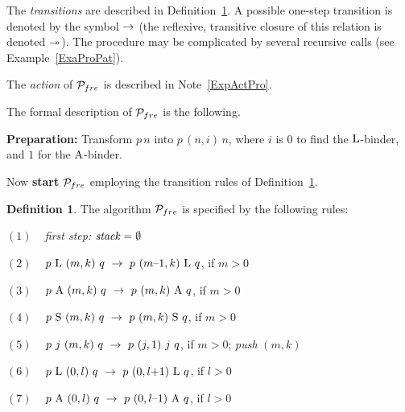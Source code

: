 \documentclass{article}
\theoremstyle{plain}
\theoremstyle{definition}
\newtheorem{Def}[The]{Definition}
\begin{document}
{The {\it transitions\/} are described in Definition~\ref{DefAlgBin}. A possible one-step transition is denoted by the symbol $\rightarrow$ (the reflexive, transitive closure of this relation is denoted $\twoheadrightarrow$). The procedure may be complicated by several recursive calls (see Example~\ref{ExaProPat}).

The {\it action\/} of ${\cal P}_{fre}$ is described in Note~\ref{ExpActPro}.



\smallskip

The formal description of ${\cal P}_{fre}$ is the following.

\smallskip

{\bf Preparation:} Transform $p \, n$ into $p \, (n,i) \, n$, where $i$ is $0$ to find the ${\rm L}$-binder, and $1$ for the ${\rm A}$-binder.

Now {\bf start} ${\cal P}_{fre}$ employing the transition rules of Definition~\ref{DefAlgBin}.







\begin{Def}\label{DefAlgBin}
The algorithm ${\cal P}_{fre}$ is specified by the following rules:

$(1)$ ~ {\it first step:} ${\it stack} = \emptyset$


$(2)$ ~ $p ~ {\rm L} ~ (m,k) ~ q ~ \rar ~ p ~ (m \makebox{--} 1,k) ~ {\rm L} ~ q$, if $m > 0$

$(3)$ ~ $p ~ {\rm A} ~ (m,k) ~ q ~ \rightarrow ~ p ~ (m,k) ~ {\rm A} ~ q$, if $m > 0$

$(4)$ ~ $p ~ {\rm S} ~ (m,k) ~ q ~ \rightarrow ~ p ~ (m,k) ~ {\rm S} ~ q$, if $m > 0$

$(5)$ ~ $p ~ j ~ (m,k) ~ q ~ \rightarrow ~ p ~ (j,1) ~ j ~ q$, if $m > 0$; {\it push} $(m,k)$

$(6)$ ~ $p ~ {\rm L} ~ (0,l) ~ q ~ \rar ~ p ~ (0,l \makebox{+} 1) ~ {\rm L} ~ q$, if $l > 0$

$(7)$ ~ $p ~ {\rm A} ~ (0,l) ~ q ~ \rar ~ p ~ (0,l \makebox{--} 1) ~ {\rm A} ~ q$, if $l > 0$


\end{Def}}
\end{document}
